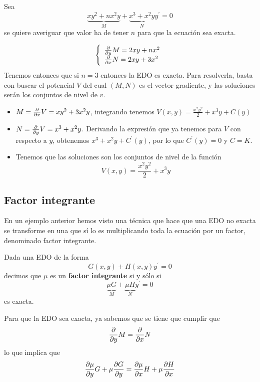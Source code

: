 \documentclass{mathnotes}
\begin{document}
\begin{example}
Sea
$$\underbrace{xy^2+nx^2y}_M+\underbrace{x^3+x^2y}_Ny^\prime = 0$$
se quiere averiguar que valor ha de tener $n$ para que la ecuación sea exacta.

$$
  \left\lbrace
  \begin{array}{l}
     \frac{\partial}{\partial y}M = 2xy+nx^2 \\
     \frac{\partial}{\partial x}N = 2xy+3x^2 \\
  \end{array}
  \right.
$$
Tenemos entonces que si $n=3$ entonces la EDO es exacta. Para resolverla, basta con buscar el potencial $V$ del cual $(M,N)$ es el vector gradiente, y las soluciones serán los conjuntos de nivel de $v$.
\begin{itemize}
\item $M = \frac{\partial}{\partial x}V = xy^2+3x^2y$, integrando tenemos $V(x,y) = \frac{x^2y^2}{2}+x^3y+C(y)$
\item $N = \frac{\partial}{\partial y}V = x^3+x^2y$. Derivando la expresión que ya tenemos para $V$ con respecto a $y$, obtenemos $x^3+x^2y+C^\prime(y)$, por lo que $C^\prime(y) = 0$ y $C=K$.
\item Tenemos que las soluciones son los conjuntos de nivel de la función $$V(x,y) = \frac{x^2y^2}{2}+x^3y$$
\end{itemize}
\end{example}

\subsection{Factor integrante}
En un ejemplo anterior hemos visto una técnica que hace que una EDO no exacta se transforme en una que sí lo es multiplicando toda la ecuación por un factor, denominado factor integrante.

\begin{definition}
Dada una EDO de la forma $$G(x,y)+H(x,y)y^\prime = 0$$ decimos que $\mu$ es un \textbf{factor integrante} si y sólo si $$\underbrace{\mu G}_{M}+\underbrace{\mu H}_{N}y^\prime = 0$$ es exacta.
\end{definition}

Para que la EDO sea exacta, ya sabemos que se tiene que cumplir que $$\frac{\partial}{\partial y}M = \frac{\partial}{\partial x}N$$ lo que implica que 
\begin{equation}
\partialder{y}{\mu}G+\mu\partialder{y}{G} = \partialder{x}{\mu}H+\mu\partialder{x}{H}
\label{eq:factor_integrante}
\end{equation}
\end{document}
